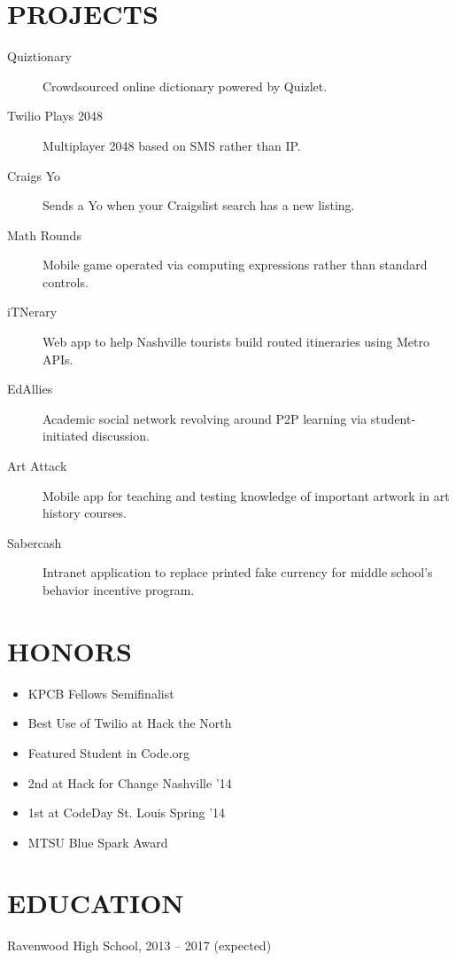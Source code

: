 \documentclass{res}
\begin{document}
\section{PROJECTS}

\begin{description}
  \item[Quiztionary] Crowdsourced online dictionary powered by Quizlet.
  \item[Twilio Plays 2048] Multiplayer 2048 based on SMS rather than IP.
  \item[Craigs Yo] Sends a Yo when your Craigslist search has a new listing.
  \item[Math Rounds] Mobile game operated via computing expressions rather than standard controls.
  \item[iTNerary] Web app to help Nashville tourists build routed itineraries using Metro APIs.
  \item[EdAllies] Academic social network revolving around P2P learning via student-initiated discussion.
  \item[Art Attack] Mobile app for teaching and testing knowledge of important artwork in art history courses.
  \item[Sabercash] Intranet application to replace printed fake currency for middle school's behavior incentive program.
\end{description}

\section{HONORS}

\begin{itemize} \itemsep -2pt
  \item KPCB Fellows Semifinalist
  \item Best Use of Twilio at Hack the North
  \item Featured Student in Code.org
  \item 2nd at Hack for Change Nashville '14
  \item 1st at CodeDay St. Louis Spring '14
  \item MTSU Blue Spark Award
\end{itemize}

\section{EDUCATION}

Ravenwood High School, 2013 -- 2017 {(expected)}
\end{document}
